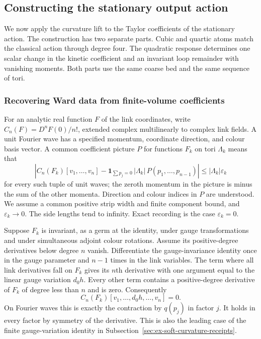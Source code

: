 \subsection{Constructing the stationary output action}
\label{sec:stationary-output-construction}
We now apply the curvature lift to the Taylor coefficients of the
stationary action. The construction has two separate parts. Cubic
and quartic atoms match the classical action through degree four.
The quadratic response determines one scalar change in the kinetic
coefficient and an invariant loop remainder with vanishing moments.
Both parts use the same coarse bed and the same sequence of tori.

\subsubsection{Recovering Ward data from finite-volume coefficients}
For an analytic real function $F$ of the link coordinates, write
$C_n(F)=D^nF(0)/n!$, extended complex multilinearly to complex link
fields. A unit Fourier wave has a specified momentum, coordinate
direction, and colour basis vector. A common coefficient picture
$P$ for functions $F_k$ on tori $\Lambda_k$ means that
\begin{equation}\label{eq:output-record}
 \left|C_n(F_k)[v_1,\ldots,v_n]
 -\mathbf1_{\sum p_j=0}\,|\Lambda_k|\,
      P(p_1,\ldots,p_{n-1})\right|
       \le |\Lambda_k|\varepsilon_k
\end{equation}
for every such tuple of unit waves; the zeroth momentum in the
picture is minus the sum of the other momenta. Direction and
colour indices in $P$ are understood. We assume a common positive
strip width and finite component bound, and $\varepsilon_k\to0$.
The side lengths tend to infinity. Exact recording is the case
$\varepsilon_k=0$.

Suppose $F_k$ is invariant, as a germ at the identity, under gauge
transformations and under simultaneous adjoint colour rotations.
Assume its positive-degree derivatives below degree $n$ vanish.
Differentiate the gauge-invariance identity once in the gauge
parameter and $n-1$ times in the link variables. The term where
all link derivatives fall on $F_k$ gives its $n$th derivative
with one argument equal to the linear gauge variation $d_0h$.
Every other term contains a positive-degree derivative of $F_k$
of degree less than $n$ and is zero. Consequently
\[
             C_n(F_k)[v_1,\ldots,d_0h,\ldots,v_n]=0.
\]
On Fourier waves this is exactly the contraction by
$q(p_j)$ in factor $j$. It holds in every factor by symmetry
of the derivative. This is also the leading case of the finite
gauge-variation identity in
Subsection~\ref{sec:ex-soft-curvature-receipts}.

